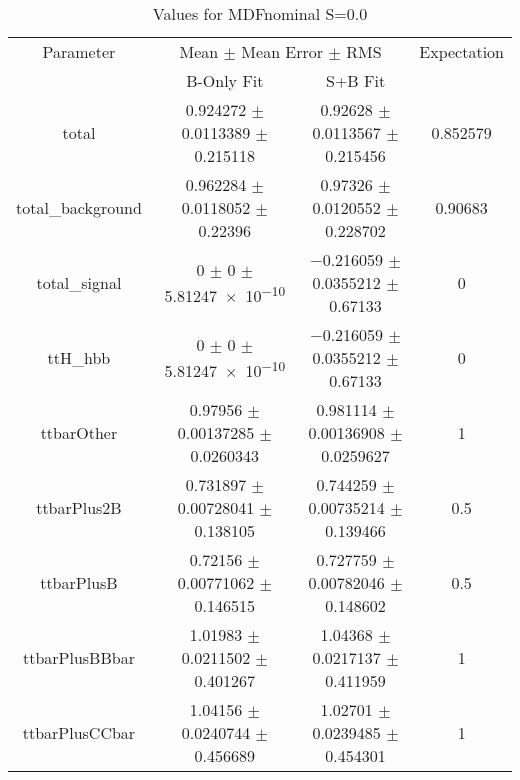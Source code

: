 \begin{table}
\centering
\caption{Values for MDFnominal S=0.0}
\begin{tabular}{cccc}
\toprule
Parameter & \multicolumn{2}{c}{Mean $\pm$ Mean Error $\pm$ RMS} & Expectation\\
 & B-Only Fit & S+B Fit & \\
\midrule
total & \num{0.924272} $\pm$ \num{0.0113389} $\pm$ \num{0.215118} & \num{0.92628} $\pm$ \num{0.0113567} $\pm$ \num{0.215456} & \num{0.852579}\\
total\_background & \num{0.962284} $\pm$ \num{0.0118052} $\pm$ \num{0.22396} & \num{0.97326} $\pm$ \num{0.0120552} $\pm$ \num{0.228702} & \num{0.90683}\\
total\_signal & \num{0} $\pm$ \num{0} $\pm$ \num{5.81247e-10} & \num{-0.216059} $\pm$ \num{0.0355212} $\pm$ \num{0.67133} & \num{0}\\
ttH\_hbb & \num{0} $\pm$ \num{0} $\pm$ \num{5.81247e-10} & \num{-0.216059} $\pm$ \num{0.0355212} $\pm$ \num{0.67133} & \num{0}\\
ttbarOther & \num{0.97956} $\pm$ \num{0.00137285} $\pm$ \num{0.0260343} & \num{0.981114} $\pm$ \num{0.00136908} $\pm$ \num{0.0259627} & \num{1}\\
ttbarPlus2B & \num{0.731897} $\pm$ \num{0.00728041} $\pm$ \num{0.138105} & \num{0.744259} $\pm$ \num{0.00735214} $\pm$ \num{0.139466} & \num{0.5}\\
ttbarPlusB & \num{0.72156} $\pm$ \num{0.00771062} $\pm$ \num{0.146515} & \num{0.727759} $\pm$ \num{0.00782046} $\pm$ \num{0.148602} & \num{0.5}\\
ttbarPlusBBbar & \num{1.01983} $\pm$ \num{0.0211502} $\pm$ \num{0.401267} & \num{1.04368} $\pm$ \num{0.0217137} $\pm$ \num{0.411959} & \num{1}\\
ttbarPlusCCbar & \num{1.04156} $\pm$ \num{0.0240744} $\pm$ \num{0.456689} & \num{1.02701} $\pm$ \num{0.0239485} $\pm$ \num{0.454301} & \num{1}\\
\bottomrule
\end{tabular}
\end{table}